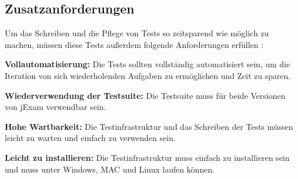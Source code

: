 \subsection{Zusatzanforderungen}

Um das Schreiben und die Pflege von Tests so zeitsparend wie m\"oglich
zu machen, m\"ussen diese Tests au{\ss}erdem folgende Anforderungen erf\"ullen :


\textbf{Vollautomatisierung:}  Die Tests sollten vollst\"andig automatisiert sein,
um die Iteration von sich wiederholenden Aufgaben zu erm\"oglichen
und Zeit zu sparen.

\textbf{Wiederverwendung der Testsuite:} Die Testsuite muss f\"ur beide Versionen 
von jExam verwendbar sein.

\textbf{Hohe Wartbarkeit:} Die Testinfrastruktur und das Schreiben der Tests
m\"ussen leicht zu warten und einfach zu verwenden sein.

\textbf{Leicht zu installieren:} Die Testinfrastruktur muss einfach zu installieren sein und muss
unter Windows, MAC und Linux laufen k\"onnen.

